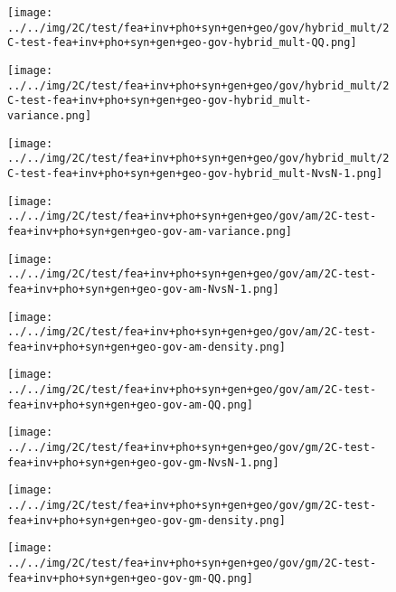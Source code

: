 \begin{figure}[H]
\centering	\texttt{[image: ../../img/2C/test/fea+inv+pho+syn+gen+geo/gov/hybrid\_mult/2C-test-fea+inv+pho+syn+gen+geo-gov-hybrid\_mult-QQ.png]}
\end{figure}
\begin{figure}[H]
\centering	\texttt{[image: ../../img/2C/test/fea+inv+pho+syn+gen+geo/gov/hybrid\_mult/2C-test-fea+inv+pho+syn+gen+geo-gov-hybrid\_mult-variance.png]}
\end{figure}
\begin{figure}[H]
\centering	\texttt{[image: ../../img/2C/test/fea+inv+pho+syn+gen+geo/gov/hybrid\_mult/2C-test-fea+inv+pho+syn+gen+geo-gov-hybrid\_mult-NvsN-1.png]}
\end{figure}
\begin{figure}[H]
\centering	\texttt{[image: ../../img/2C/test/fea+inv+pho+syn+gen+geo/gov/am/2C-test-fea+inv+pho+syn+gen+geo-gov-am-variance.png]}
\end{figure}
\begin{figure}[H]
\centering	\texttt{[image: ../../img/2C/test/fea+inv+pho+syn+gen+geo/gov/am/2C-test-fea+inv+pho+syn+gen+geo-gov-am-NvsN-1.png]}
\end{figure}
\begin{figure}[H]
\centering	\texttt{[image: ../../img/2C/test/fea+inv+pho+syn+gen+geo/gov/am/2C-test-fea+inv+pho+syn+gen+geo-gov-am-density.png]}
\end{figure}
\begin{figure}[H]
\centering	\texttt{[image: ../../img/2C/test/fea+inv+pho+syn+gen+geo/gov/am/2C-test-fea+inv+pho+syn+gen+geo-gov-am-QQ.png]}
\end{figure}
\begin{figure}[H]
\centering	\texttt{[image: ../../img/2C/test/fea+inv+pho+syn+gen+geo/gov/gm/2C-test-fea+inv+pho+syn+gen+geo-gov-gm-NvsN-1.png]}
\end{figure}
\begin{figure}[H]
\centering	\texttt{[image: ../../img/2C/test/fea+inv+pho+syn+gen+geo/gov/gm/2C-test-fea+inv+pho+syn+gen+geo-gov-gm-density.png]}
\end{figure}
\begin{figure}[H]
\centering	\texttt{[image: ../../img/2C/test/fea+inv+pho+syn+gen+geo/gov/gm/2C-test-fea+inv+pho+syn+gen+geo-gov-gm-QQ.png]}
\end{figure}
